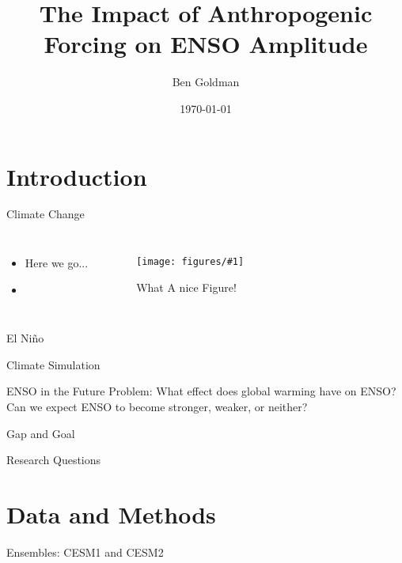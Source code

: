 \documentclass{beamer}
\title{The Impact of Anthropogenic Forcing on ENSO Amplitude}
\author{Ben Goldman}
\date{\today}
\newcommand{\myfig}[3]{
  \begin{figure}
    \centering
    \texttt{[image: figures/\#1]}
    \caption{#2}
    \label{fig:#3}
  \end{figure}
}
\begin{document}
\maketitle

\section{Introduction}

\begin{frame}{Climate Change}

  \begin{columns}
    \begin{itemize}
    \item Here we go...
    \item \cite{bjerknes1969atmospheric}
    \end{itemize}
    \myfig{example.jpg}{What A nice Figure!}{this}
  \end{columns}
\end{frame}

\begin{frame}{El Niño}

\end{frame}

\begin{frame}{Climate Simulation}

\end{frame}

\begin{frame}{ENSO in the Future}
  Problem: What effect does global warming have on ENSO? Can we expect ENSO to become stronger, weaker, or neither?
\end{frame}

\begin{frame}{Gap and Goal}

\end{frame}

\begin{frame}{Research Questions}

\end{frame}

\section{Data and Methods}

\begin{frame}{Ensembles: CESM1 and CESM2}

\end{frame}
\end{document}
